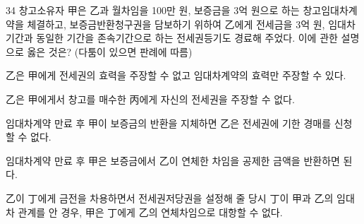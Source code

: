 \begin{question}{34}
창고소유자 甲은 乙과 월차임을 100만 원, 보증금을 3억 원으로 하는 창고임대차계약을 체결하고, 보증금반환청구권을 담보하기 위하여 乙에게 전세금을 3억 원, 임대차기간과 동일한 기간을 존속기간으로 하는 전세권등기도 경료해 주었다. 이에 관한 설명으로 옳은 것은? (다툼이 있으면 판례에 따름)
\begin{choices}
  \item 乙은 甲에게 전세권의 효력을 주장할 수 없고 임대차계약의 효력만 주장할 수 있다.
  \item 乙은 甲에게서 창고를 매수한 丙에게 자신의 전세권을 주장할 수 없다.
  \item 임대차계약 만료 후 甲이 보증금의 반환을 지체하면 乙은 전세권에 기한 경매를 신청할 수 없다.
  \item 임대차계약 만료 후 甲은 보증금에서 乙이 연체한 차임을 공제한 금액을 반환하면 된다.
  \item 乙이 丁에게 금전을 차용하면서 전세권저당권을 설정해 줄 당시 丁이 甲과 乙의 임대차 관계를 안 경우, 甲은 丁에게 乙의 연체차임으로 대항할 수 없다.
\end{choices}
\end{question}
